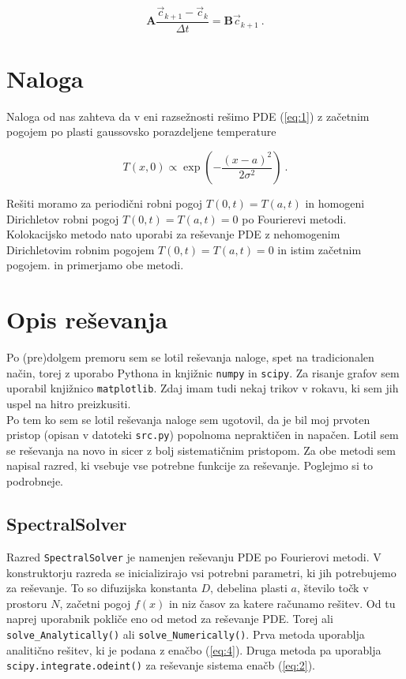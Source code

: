 \documentclass[a4paper]{article}
\begin{document}
\begin{equation}
    \mathbf{A}\frac{\vec{c}_{k+1}-\vec{c}_k}{\Delta t} = \mathbf{B}\vec{c}_{k+1}\>.
\end{equation}

\section{Naloga}
Naloga od nas zahteva da v eni razsežnosti rešimo PDE (\ref{eq:1}) z začetnim pogojem
po plasti gaussovsko porazdeljene temperature

\begin{equation}
    T(x, 0) \propto \exp{\left(-\frac{(x-a)^2}{2\sigma^2}\right)}\>.
\end{equation}

Rešiti moramo za periodični robni pogoj $T(0, t) = T(a, t)$ in homogeni Dirichletov robni pogoj
$T(0, t) = T(a, t) = 0$ po Fourierevi metodi. Kolokacijsko metodo nato uporabi za reševanje
PDE z nehomogenim Dirichletovim robnim pogojem $T(0, t) = T(a, t) = 0$ in istim začetnim pogojem.
in primerjamo obe metodi.\\

\section{Opis reševanja}
Po (pre)dolgem premoru sem se lotil reševanja naloge, spet na tradicionalen način, torej z uporabo 
Pythona in knjižnic \texttt{numpy} in \texttt{scipy}. Za risanje grafov sem uporabil knjižnico
\texttt{matplotlib}. Zdaj imam tudi nekaj trikov v rokavu, ki sem jih uspel na hitro preizkusiti.\\

Po tem ko sem se lotil reševanja naloge sem ugotovil, da je bil moj prvoten pristop (opisan v 
datoteki \texttt{src.py}) popolnoma nepraktičen in napačen. Lotil sem se reševanja na novo in sicer
z bolj sistematičnim pristopom. Za obe metodi sem napisal razred, ki vsebuje vse potrebne funkcije
za reševanje. Poglejmo si to podrobneje.\\

\subsection{SpectralSolver}
Razred \texttt{SpectralSolver} je namenjen reševanju PDE po Fourierovi metodi. V konstruktorju
razreda se inicializirajo vsi potrebni parametri, ki jih potrebujemo za reševanje. To so 
difuzijska konstanta $D$, debelina plasti $a$, število točk v prostoru $N$, začetni pogoj $f(x)$ in
niz časov za katere računamo rešitev. Od tu naprej uporabnik pokliče eno od metod za reševanje
PDE. Torej ali \texttt{solve\_Analytically()} ali \texttt{solve\_Numerically()}. Prva metoda uporablja
analitično rešitev, ki je podana z enačbo (\ref{eq:4}). Druga metoda pa uporablja \\
\texttt{scipy.integrate.odeint()} za reševanje sistema enačb (\ref{eq:2}).\\
\end{document}
